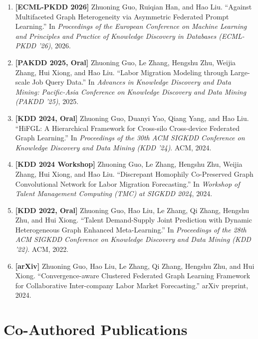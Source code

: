 \begin{enumerate}
    \item \textbf{[ECML-PKDD 2026]} Zhuoning Guo, Ruiqian Han, and Hao Liu. ``Against Multifaceted Graph Heterogeneity via Asymmetric Federated Prompt Learning.'' In \emph{Proceedings of the European Conference on Machine Learning and Principles and Practice of Knowledge Discovery in Databases (ECML-PKDD '26)}, 2026.

    \item \textbf{[PAKDD 2025, Oral]} Zhuoning Guo, Le Zhang, Hengshu Zhu, Weijia Zhang, Hui Xiong, and Hao Liu. ``Labor Migration Modeling through Large-scale Job Query Data.'' In \emph{Advances in Knowledge Discovery and Data Mining: Pacific-Asia Conference on Knowledge Discovery and Data Mining (PAKDD '25)}, 2025.

    \item \textbf{[KDD 2024, Oral]} Zhuoning Guo, Duanyi Yao, Qiang Yang, and Hao Liu. ``HiFGL: A Hierarchical Framework for Cross-silo Cross-device Federated Graph Learning.'' In \emph{Proceedings of the 30th ACM SIGKDD Conference on Knowledge Discovery and Data Mining (KDD '24)}. ACM, 2024.

    \item \textbf{[KDD 2024 Workshop]} Zhuoning Guo, Le Zhang, Hengshu Zhu, Weijia Zhang, Hui Xiong, and Hao Liu. ``Discrepant Homophily Co-Preserved Graph Convolutional Network for Labor Migration Forecasting.'' In \emph{Workshop of Talent Management Computing (TMC) at SIGKDD 2024}, 2024.

    \item \textbf{[KDD 2022, Oral]} Zhuoning Guo, Hao Liu, Le Zhang, Qi Zhang, Hengshu Zhu, and Hui Xiong. ``Talent Demand-Supply Joint Prediction with Dynamic Heterogeneous Graph Enhanced Meta-Learning.'' In \emph{Proceedings of the 28th ACM SIGKDD Conference on Knowledge Discovery and Data Mining (KDD '22)}. ACM, 2022.

    \item \textbf{[arXiv]} Zhuoning Guo, Hao Liu, Le Zhang, Qi Zhang, Hengshu Zhu, and Hui Xiong. ``Convergence-aware Clustered Federated Graph Learning Framework for Collaborative Inter-company Labor Market Forecasting.'' arXiv preprint, 2024.
\end{enumerate}

\section*{Co-Authored Publications}

